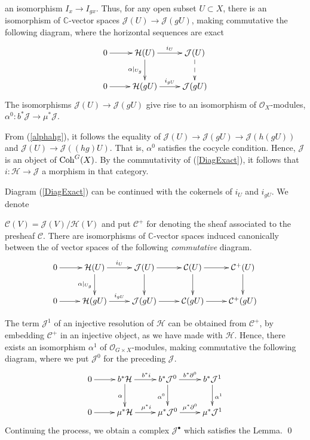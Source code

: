 \documentclass[xypic,amscd,syntonly,amssymb,verbatim,12pt]{amsart}
\theoremstyle{plain}
\theoremstyle{definition}
\theoremstyle{remark}
\numberwithin{equation}{section}
\begin{document}
  an isomorphism $I_x\to I_{gx}$. Thus, for any open subset $U\subset X$,
  there is an isomorphism of ${\mathbb C}$-vector spaces ${\mathcal J}(U)\to{\mathcal J}(gU)$, making commutative the following diagram, where
   the horizontal sequences are exact
   \begin{equation}\label{DiagExact}
    \xymatrix{ 0\ar[r]  & {\mathcal H}(U) \ar[d]_{\alpha|_{U_g}}\ar[r]^{i_U} & {\mathcal J}(U)\ar@{-->}[d] \\
   0\ar[r] &  {\mathcal H}(gU)\ar[r]^{i_{gU}} & {\mathcal J}(gU)
  }
 \end{equation}
 The isomorphisms ${\mathcal J}(U)\to{\mathcal J}(gU)$
  give rise to an isomorphism of ${\mathcal O}_X$-modules,  $\alpha^0:b^*{\mathcal J}\to \mu^*{\mathcal J}$.


 From (\ref{alphahg}), it follows
  the equality of
 ${\mathcal J}(U)\to{\mathcal J}(gU)\to {\mathcal J}(h(gU))$ and ${\mathcal J}(U)\to{\mathcal J}((hg)U).$
  That is, $\alpha^0$
 satisfies the cocycle condition. Hence, ${\mathcal J}$ is an object of ${\rm Coh}^G(X)$. By the commutativity of
  (\ref{DiagExact}), it follows that
  $i:{\mathcal H}\to{\mathcal J}$ a morphism in that category.




  Diagram (\ref{DiagExact}) can be continued with the cokernels of $i_U$ and $i_{gU}$.
  We denote
  
   ${\mathcal C}(V)={\mathcal J}(V)/{\mathcal H}(V)$ and put ${\mathcal C}^+$ for denoting the sheaf
   associated to the presheaf ${\mathcal C}$.
   There  are isomorphisms of ${\mathbb C}$-vector spaces induced  canonically  between
   the of vector spaces of the following {\em commutative} diagram.
  \begin{equation}\label{DiagExact1}
    \xymatrix{ 0\ar[r]  & {\mathcal H}(U) \ar[d]_{\alpha|_{U_g}}\ar[r]^{i_U} & {\mathcal J}(U)\ar[d] \ar[r] &{\mathcal C}(U)\ar[d]\ar[r]&{\mathcal C}^+(U)\ar[d] \\
   0\ar[r] &  {\mathcal H}(gU)\ar[r]^{i_{gU}} & {\mathcal J}(gU) \ar[r] & {\mathcal C}(gU) \ar[r] &  {\mathcal C}^+(gU)
  }
 \end{equation}

The term ${\mathcal J}^1$ of an injective resolution of ${\mathcal
H}$ can be obtained from ${\mathcal C}^+$, by embedding ${\mathcal
C}^+$ in an injective object, as we have made with ${\mathcal H}$. Hence, there exists an isomorphism $\alpha^1$ of ${\mathcal O}_{G\times X}$-modules,  making commutative the following diagram, where we put ${\mathcal J}^0$ for the preceding ${\mathcal J}$.
\begin{equation}\label{DiagExact12}
    \xymatrix{ 0\ar[r]  & b^*{\mathcal H} \ar[d]_{\alpha}\ar[r]^{b^*i} & b^*{\mathcal J}^0 \ar[d]_{{\alpha}^0} \ar[r]^{b^*{\partial}^0} & b^*{\mathcal J}^1\ar[d]^{{\alpha}^1}  \\
   0\ar[r] & \mu^* {\mathcal H}\ar[r]^{\mu^*i} & \mu^*{\mathcal J}^0 \ar[r]^{\mu^*{\partial}^0} & \mu^*{\mathcal J}^1 }
 \end{equation}
 Continuing the process, we obtain a complex ${\mathcal J}^{\bullet}$ which satisfies the Lemma.
 \qed
\end{document}
